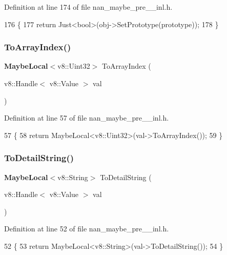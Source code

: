 Definition at line 174 of file nan\+\_\+maybe\+\_\+pre\+\_\+\_\+inl.\+h.


\begin{DoxyCode}
176                                  \{
177   \textcolor{keywordflow}{return} Just<bool>(obj->SetPrototype(prototype));
178 \}
\end{DoxyCode}
\mbox{\label{nan__maybe__pre__43__inl_8h_a5216a945dd4f764490df4f97eaa791d8}} 
\subsubsection{To\+Array\+Index()}
{\footnotesize\ttfamily \textbf{ Maybe\+Local}$<$v8\+::\+Uint32$>$ To\+Array\+Index (\begin{DoxyParamCaption}\item[{v8\+::\+Handle$<$ v8\+::\+Value $>$}]{val }\end{DoxyParamCaption})}



Definition at line 57 of file nan\+\_\+maybe\+\_\+pre\+\_\+\_\+inl.\+h.


\begin{DoxyCode}
57                                                          \{
58   \textcolor{keywordflow}{return} MaybeLocal<v8::Uint32>(val->ToArrayIndex());
59 \}
\end{DoxyCode}
\mbox{\label{nan__maybe__pre__43__inl_8h_a7e5ed73b1615644ee427b6cdcabce87a}} 
\subsubsection{To\+Detail\+String()}
{\footnotesize\ttfamily \textbf{ Maybe\+Local}$<$v8\+::\+String$>$ To\+Detail\+String (\begin{DoxyParamCaption}\item[{v8\+::\+Handle$<$ v8\+::\+Value $>$}]{val }\end{DoxyParamCaption})}



Definition at line 52 of file nan\+\_\+maybe\+\_\+pre\+\_\+\_\+inl.\+h.


\begin{DoxyCode}
52                                                            \{
53   \textcolor{keywordflow}{return} MaybeLocal<v8::String>(val->ToDetailString());
54 \}
\end{DoxyCode}
